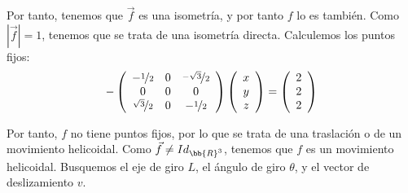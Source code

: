 \begin{ejercicio}
\begin{enumerate}
        Por tanto, tenemos que $\vec{f}$ es una isometría, y por tanto $f$ lo es también. Como $\left|\vec{f}\right|=1$, tenemos que se trata de una isometría directa. Calculemos los puntos fijos:
        \begin{equation*}
            -\left(
            \begin{array}{ccc}
                -\nicefrac{1}{2} & 0 & \nicefrac{-\sqrt{3}}{2} \\
                0 & 0 & 0 \\
                \nicefrac{\sqrt{3}}{2} & 0 & -\nicefrac{1}{2} 
            \end{array}
            \right)
            \left(
            \begin{array}{c}
                x \\ y \\ z
            \end{array}
            \right)
            = \left(
            \begin{array}{c}
                2 \\ 2 \\ 2
            \end{array}
            \right)
        \end{equation*}

        Por tanto, $f$ no tiene puntos fijos, por lo que se trata de una traslación o de un movimiento helicoidal. Como $\vec{f}\neq Id_{\bb{R}^3}$, tenemos que $f$ es un movimiento helicoidal. Busquemos el eje de giro $L$, el ángulo de giro $\theta$, y el vector de deslizamiento $v$.


\end{enumerate}
\end{ejercicio}
